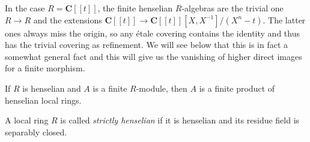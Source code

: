 
\begin{example}
In the case $R = \mathbf{C} [[ t ]]$, the finite henselian $R$-algebras are the trivial one $R \to R$ and the extensions $ \mathbf{C} [[ t ]] \to \mathbf{C} [[ t ]] [X, X^{-1}]/(X^n-t)$. The latter ones always miss the origin, so any \'etale covering contains the identity and thus has the trivial covering as refinement. We will see below that this is in fact a somewhat general fact and this will give us the vanishing of higher direct images for a finite morphism.
\end{example}

\begin{lemma} \label{cor:FiniteOverHenselianIs Henselian}
If $R$ is henselian and $A$ is a finite $R$-module, then $A$ is a finite product of henselian local rings. 
\end{lemma}

\begin{definition} 
A local ring $R$ is called \emph{strictly henselian} if it is henselian and its residue field is separably closed. 
\end{definition}

